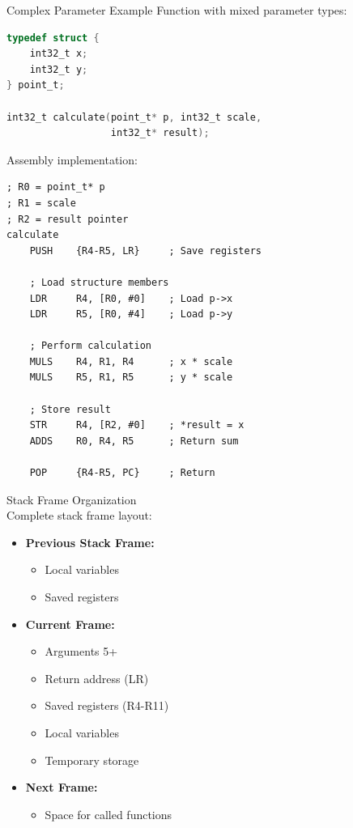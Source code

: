 \begin{example2}{Complex Parameter Example}
Function with mixed parameter types:
\begin{lstlisting}[language=C, style=basesmol]
typedef struct {
    int32_t x;
    int32_t y;
} point_t;

int32_t calculate(point_t* p, int32_t scale, 
                  int32_t* result);
\end{lstlisting}

Assembly implementation:
\begin{lstlisting}[language=armasm, style=basesmol]
; R0 = point_t* p
; R1 = scale
; R2 = result pointer
calculate
    PUSH    {R4-R5, LR}     ; Save registers
    
    ; Load structure members
    LDR     R4, [R0, #0]    ; Load p->x
    LDR     R5, [R0, #4]    ; Load p->y
    
    ; Perform calculation
    MULS    R4, R1, R4      ; x * scale
    MULS    R5, R1, R5      ; y * scale
    
    ; Store result
    STR     R4, [R2, #0]    ; *result = x
    ADDS    R0, R4, R5      ; Return sum
    
    POP     {R4-R5, PC}     ; Return
\end{lstlisting}
\end{example2}






\begin{concept}{Stack Frame Organization}\\
Complete stack frame layout:

\begin{itemize}
  \item \textbf{Previous Stack Frame:}
    \begin{itemize}
      \item Local variables
      \item Saved registers
    \end{itemize}
  \item \textbf{Current Frame:}
    \begin{itemize}
      \item Arguments 5+
      \item Return address (LR)
      \item Saved registers (R4-R11)
      \item Local variables
      \item Temporary storage
    \end{itemize}
  \item \textbf{Next Frame:}
    \begin{itemize}
      \item Space for called functions
    \end{itemize}
\end{itemize}
\end{concept}

